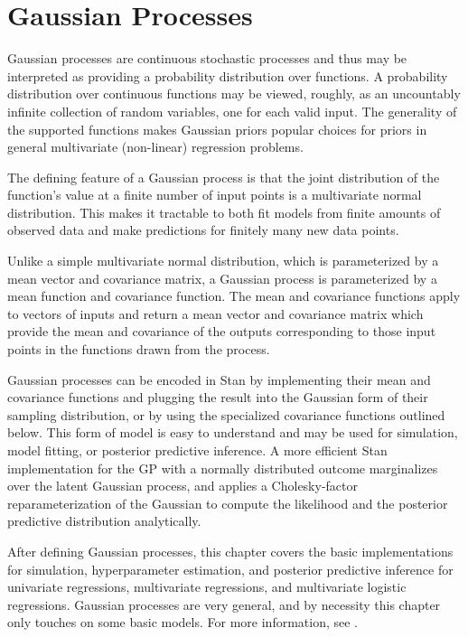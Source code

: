 \chapter{Gaussian Processes}\label{gaussian-processes.chapter}

\noindent
Gaussian processes are continuous stochastic processes and thus may be
interpreted as providing a probability distribution over functions.  A
probability distribution over continuous functions may be viewed,
roughly, as an uncountably infinite collection of random variables,
one for each valid input.  The generality of the supported functions
makes Gaussian priors popular choices for priors in general
multivariate (non-linear) regression problems.

The defining feature of a Gaussian process is that the joint distribution of
the function's value at a finite number of input points is a multivariate
normal distribution.  This makes it tractable to both fit models from finite
amounts of observed data and make predictions for finitely many new data
points. 

Unlike a simple multivariate normal distribution, which is
parameterized by a mean vector and covariance matrix, a Gaussian
process is parameterized by a mean function and covariance function.
The mean and covariance functions apply to vectors of inputs and
return a mean vector and covariance matrix which provide the mean and
covariance of the outputs corresponding to those input points in the
functions drawn from the process.

Gaussian processes can be encoded in Stan by implementing their mean and
covariance functions and plugging the result into the Gaussian form of their
sampling distribution, or by using the specialized covariance functions
outlined below.  This form of model is easy to understand and may be used for
simulation, model fitting, or posterior predictive inference. A more efficient
Stan implementation for the GP with a normally distributed outcome marginalizes
over the latent Gaussian process, and applies a Cholesky-factor
reparameterization of the Gaussian to compute the likelihood and the posterior
predictive distribution analytically.

After defining Gaussian processes, this chapter covers the basic
implementations for simulation, hyperparameter estimation, and
posterior predictive inference for univariate regressions,
multivariate regressions, and multivariate logistic regressions.
Gaussian processes are very general, and by necessity this chapter
only touches on some basic models.  For more information, see
\citep{RasmussenWilliams:2006}.


